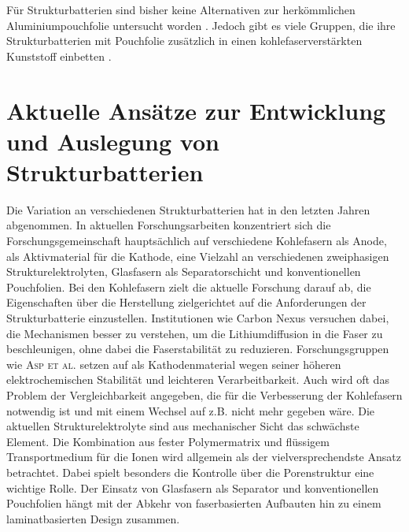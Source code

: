 Für Strukturbatterien sind bisher keine Alternativen zur herkömmlichen Aluminiumpouchfolie untersucht worden \cite{Ye2024}. Jedoch gibt es viele Gruppen, die ihre Strukturbatterien mit Pouchfolie zusätzlich in einen kohlefaserverstärkten Kunststoff einbetten \cite{Pattarakunnan2020,Asp2021}.

\section{Aktuelle Ansätze zur Entwicklung und Auslegung von Strukturbatterien}
Die Variation an verschiedenen Strukturbatterien hat in den letzten Jahren abgenommen. In aktuellen Forschungsarbeiten konzentriert sich die Forschungsgemeinschaft hauptsächlich auf verschiedene Kohlefasern als Anode,  als Aktivmaterial für die Kathode, eine Vielzahl an verschiedenen zweiphasigen Strukturelektrolyten, Glasfasern als Separatorschicht und konventionellen Pouchfolien. Bei den Kohlefasern zielt die aktuelle Forschung darauf ab, die Eigenschaften über die Herstellung zielgerichtet auf die Anforderungen der Strukturbatterie einzustellen. Institutionen wie Carbon Nexus versuchen dabei, die Mechanismen besser zu verstehen, um die Lithiumdiffusion in die Faser zu beschleunigen, ohne dabei die Faserstabilität zu reduzieren. Forschungsgruppen wie \textsc{Asp et al.} setzen auf  als Kathodenmaterial wegen seiner höheren elektrochemischen Stabilität und leichteren Verarbeitbarkeit. Auch wird oft das Problem der Vergleichbarkeit angegeben, die für die Verbesserung der Kohlefasern notwendig ist und mit einem Wechsel auf z.B.  nicht mehr gegeben wäre. Die aktuellen Strukturelektrolyte sind aus mechanischer Sicht das schwächste Element. Die Kombination aus fester Polymermatrix und flüssigem Transportmedium für die Ionen wird allgemein als der vielversprechendste Ansatz betrachtet. Dabei spielt besonders die Kontrolle über die Porenstruktur eine wichtige Rolle. Der Einsatz von Glasfasern als Separator und konventionellen Pouchfolien hängt mit der Abkehr von faserbasierten Aufbauten hin zu einem laminatbasierten Design zusammen.


